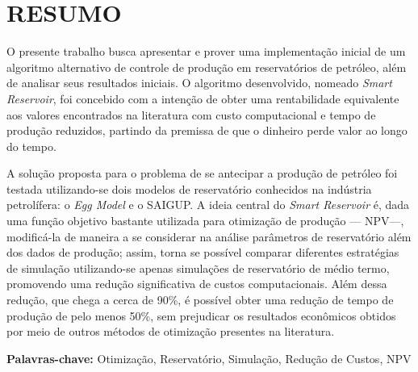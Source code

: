 
\chapter[RESUMO]{RESUMO}
{O presente trabalho busca apresentar e prover uma implementa\c{c}\~{a}o inicial de um algoritmo alternativo de controle de produ\c{c}\~{a}o em reservat\'{o}rios de petr\'{o}leo, al\'{e}m de analisar seus resultados iniciais. O algoritmo desenvolvido, nomeado \textit{Smart Reservoir}, foi concebido com a inten\c{c}\~{a}o de obter uma rentabilidade equivalente aos valores encontrados na literatura com custo computacional e tempo de produ\c{c}\~{a}o reduzidos, partindo da premissa de que o dinheiro perde valor ao longo do tempo. 

A solu\c{c}\~{a}o proposta para o problema de se antecipar a produ\c{c}\~{a}o de petr\'{o}leo foi testada utilizando-se dois modelos de reservat\'{o}rio conhecidos na ind\'{u}stria petrol\'{i}fera: o \textit{Egg Model} e o SAIGUP. A ideia central do \textit{Smart Reservoir} \'{e}, dada uma fun\c{c}\~{a}o objetivo bastante utilizada para otimiza\c{c}\~{a}o de produ\c{c}\~{a}o --- NPV---, modific\'{a}-la de maneira a se considerar na an\'{a}lise par\^{a}metros de reservat\'{o}rio al\'{e}m dos dados de produ\c{c}\~{a}o; assim, torna se poss\'{i}vel comparar diferentes estrat\'{e}gias de simula\c{c}\~{a}o utilizando-se apenas simula\c{c}\~{o}es de reservat\'{o}rio de m\'{e}dio termo, promovendo uma redu\c{c}\~{a}o significativa de custos computacionais. Al\'{e}m dessa redu\c{c}\~{a}o, que chega a cerca de 90\%,  \'{e} poss\'{i}vel obter uma redu\c{c}\~{a}o de tempo de produ\c{c}\~{a}o de pelo menos 50\%, sem prejudicar os resultados econ\^{o}micos obtidos por meio de outros m\'{e}todos de otimiza\c{c}\~{a}o presentes na literatura.

\textbf{Palavras-chave:} Otimiza\c{c}\~{a}o, Reservat\'{o}rio, Simula\c{c}\~{a}o, Redu\c{c}\~{a}o de Custos, NPV
}

\vspace*{2cm}

\newpage

